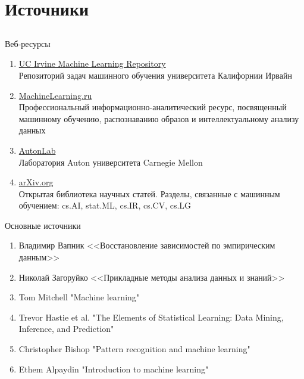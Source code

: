 \documentclass[compress,red,unicode]{beamer}
\begin{document}
\section{Источники}
\subsection{}

\begin{frame}{Веб-ресурсы}
\begin{enumerate}
	\item \href{http://www.ics.uci.edu/~mlearn/MLRepository.html}{\color{main!80!black} UC Irvine Machine Learning Repository} \\
	Репозиторий задач машинного обучения университета Калифорнии Ирвайн 
	\item \href{http://machinelearning.ru/}{\color{main!80!black} MachineLearning.ru} \\ 
	Профессиональный информационно-аналитический ресурс, посвященный
машинному обучению, распознаванию образов и интеллектуальному анализу данных
	\item \href{http://www.autonlab.org/autonweb/2.html}{\color{main!80!black} AutonLab} \\
	Лаборатория Auton университета Carnegie Mellon
	\item \href{http://arxiv.org}{\color{main!80!black} arXiv.org} \\
	Открытая библиотека научных статей. Разделы, связанные с машинным обучением: cs.AI, stat.ML, cs.IR, cs.CV, cs.LG
\end{enumerate}
\end{frame}

\begin{frame}{Основные источники}
\begin{enumerate}
	\item Владимир Вапник <<Восстановление зависимостей по эмпирическим данным>>
	\item Николай Загоруйко <<Прикладные методы анализа данных и знаний>>
	\item Tom Mitchell "Machine learning"
	\item Trevor Hastie et al. "The Elements of Statistical Learning: Data Mining, Inference, and Prediction"
	\item Christopher Bishop "Pattern recognition and machine learning"
	\item Ethem Alpaydin "Introduction to machine learning"
\end{enumerate}
\end{frame}
\end{document}
